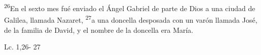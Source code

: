 \documentclass[../../rosario.tex]{subfiles}
\begin{document}
    \textsuperscript{26}En el sexto mes fué enviado el Ángel Gabriel de parte de Dios a una ciudad de Galilea, llamada Nazaret, \textsuperscript{27}a una 
    doncella desposada con un varón llamada José, de la familia de David, y el nombre de la doncella era María.
    \begin{flushright}
    Lc. 1,26- 27
    \end{flushright}
\end{document}
